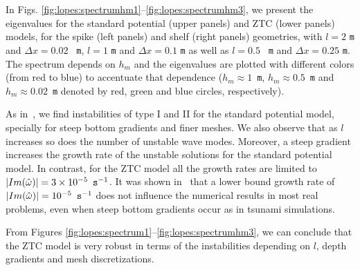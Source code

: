 In Figs. \ref{fig:lopes:spectrumhm1}--\ref{fig:lopes:spectrumhm3}, we
present the eigenvalues for the standard potential (upper panels) and
ZTC (lower panels) models, for the spike (left panels) and shelf
(right panels) geometries, with $l=2$ {\tt m} and $\Delta x=0.02$ {\tt
m}, $l=1$ {\tt m} and $\Delta x=0.1$ {\tt m} as well as $l=0.5$ {\tt
m} and $\Delta x=0.25$ {\tt m}.  The spectrum depends on $h_m$ and the
eigenvalues are plotted with different colors (from red to blue) to
accentuate that dependence ($h_m\approx 1$~{\tt m}, $h_m\approx
0.5$~{\tt m} and $h_m\approx 0.02$~{\tt m} denoted by red, green and
blue circles, respectively).

As in~\citet{LovholtPedersen2009}, we find instabilities of type I and
II for the standard potential model, specially for steep bottom
gradients and finer meshes.  We also observe that as $l$ increases so
does the number of unstable wave modes.  Moreover, a steep gradient
increases the growth rate of the unstable solutions for the standard
potential model.  In contrast, for the ZTC model all the growth rates
are limited to $|Im(\hat\omega)|=3\times 10^{-5}\,~{\tt s}^{-1}$.  It
was shown in~\citet{LovholtPedersen2009} that a lower bound growth
rate of $|Im(\hat\omega)|=10^{-5}\,~{\tt s}^{-1}$ does not influence
the numerical results in most real problems, even when steep bottom
gradients occur as in tsunami simulations.

From Figures \ref{fig:lopes:spectrum1}--\ref{fig:lopes:spectrumhm3},
we can conclude that the ZTC model is very robust in terms of the
instabilities depending on $l$, depth gradients and mesh
discretizations.

